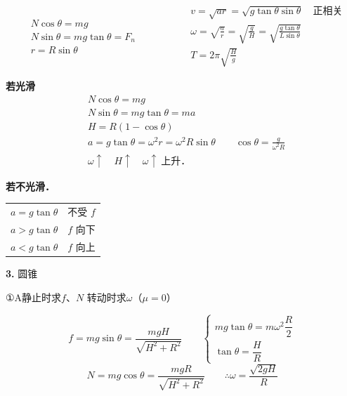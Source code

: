 \[
\begin{aligned}
&N\cos\theta = mg\\
&N\sin\theta = mg\tan\theta = F_n\\
&r = R\sin\theta
\end{aligned}
\qquad\qquad
\begin{aligned}
&v=\sqrt{ar}=\sqrt{g\tan\theta\sin\theta}\quad\text{正相关}\\
&\omega=\sqrt{\frac{a}{r}}=\sqrt{\frac{g}{H}}=\sqrt{\frac{g\tan\theta}{L\sin\theta}}\\
&T=2\pi\sqrt{\frac{H}{g}}
\end{aligned}
\]

\textbf{若光滑}
\begin{align*}
&N\cos\theta = mg\\
&N\sin\theta = mg\tan\theta = ma\\
&H = R(1-\cos\theta)\\
&a = g\tan\theta = \omega^2 r = \omega^2 R\sin\theta \qquad \cos\theta = \frac{g}{\omega^2 R}\\
&\omega\uparrow\quad H\uparrow\quad \omega\uparrow\ \text{上升．}
\end{align*}

\textbf{若不光滑．}
\begin{center}
\begin{tabular}{@{}ll@{}}
$a=g\tan\theta$ & 不受 $f$\\
$a>g\tan\theta$ & $f$ 向下\\
$a<g\tan\theta$ & $f$ 向上\\
\end{tabular}
\end{center}

\textbf{3.} 圆锥

①A静止时求$f$、$N$ \quad 转动时求$\omega$（$\mu=0$）

\[ f=mg\sin\theta=\frac{mgH}{\sqrt{H^{2}+R^{2}}}\qquad
\begin{cases} mg\tan\theta=m\omega^{2}\dfrac{R}{2}\\[4pt] \tan\theta=\dfrac{H}{R}\end{cases} \]
\[ N=mg\cos\theta=\frac{mgR}{\sqrt{H^{2}+R^{2}}}\qquad \therefore\omega=\frac{\sqrt{2gH}}{R} \]

